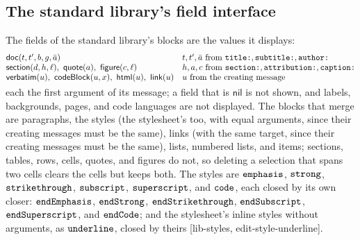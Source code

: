 \documentclass[11pt]{article}
\numberwithin{equation}{section}
\newcommand{\kw}[1]{\ensuremath{\mathsf{#1}}}
\newcommand{\str}[1]{\ensuremath{\text{\texttt{#1}}}}
\begin{document}
\subsection{The standard library's field interface}
\label{sec:lib-field}

The fields of the standard library's blocks are the values it displays:
\begin{equation}\label{eq:lib-fields}
\begin{array}{@{}ll@{}}
\kw{doc}(t, t', b, g, \bar a) & t, t', \bar a \text{ from } \str{title:},
  \str{subtitle:}, \str{author:} \\
\kw{section}(d, h, \ell),\ \kw{quote}(a),\ \kw{figure}(c, \ell)
  & h, a, c \text{ from } \str{section:}, \str{attribution:},
  \str{caption:} \\
\kw{verbatim}(u),\ \kw{codeBlock}(u, x),\ \kw{html}(u),\ \kw{link}(u)
  & u \text{ from the creating message} \\[-1ex]
\end{array}
\end{equation}
each the first argument of its message; a field that is $\kw{nil}$ is not
shown, and labels, backgrounds, pages, and code languages are not
displayed.  The blocks that merge are paragraphs, the styles (the
stylesheet's too, with equal arguments, since their creating messages must
be the same), links (with the same target, since
their creating messages must be the same), lists, numbered lists, and items;
sections, tables, rows, cells, quotes, and figures do not, so deleting a
selection that spans two cells clears the cells but keeps both.  The styles
are $\str{emphasis}$, $\str{strong}$,
$\str{strikethrough}$, $\str{subscript}$, $\str{superscript}$, and
$\str{code}$, each closed by its own closer: $\str{endEmphasis}$,
$\str{endStrong}$, $\str{endStrikethrough}$,
$\str{endSubscript}$, $\str{endSuperscript}$, and $\str{endCode}$; and the
stylesheet's inline styles without arguments, as $\str{underline}$, closed by
theirs [lib-styles, edit-style-underline].
\end{document}
